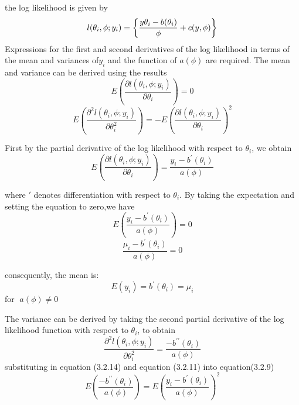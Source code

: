 the log likelihood is given by
\begin{equation}
	\centering 
	l(\theta_i,\phi;y_i) =\left\{ \frac{y\theta_i-b(\theta_i)}{\phi} + c(y,\phi)\right\}
\end{equation}
Expressions for the first and second derivatives of the log likelihood in terms of the mean and variances of$y_i$ and the function of $a(\phi)$ are required. The mean and variance can be derived using the results
\begin{equation}
	E\left(\frac{\partial l(\theta_i,\phi;y_i)}{\partial\theta_i}\right)=0
\end{equation}
\begin{equation}	
	E\left(\frac{\partial^2 l(\theta_i,\phi;y_i)}{\partial\theta_i^2}\right)= -E\left(\frac{\partial l(\theta_i,\phi;y_i)}{\partial\theta_i}\right)^2
\end{equation}

First by the partial derivative of the log likelihood with respect to $\theta_i$, we obtain 
\begin{equation}
	E\left(\frac{\partial l(\theta_i,\phi;y_i)}{\partial\theta_i}\right)=\frac{y_i-b^{\prime}(\theta_i)}{a(\phi)}
\end{equation}

where $\prime$ denotes differentiation with respect to $\theta_i$. By taking the expectation and setting the equation to zero,we have
\begin{equation}
	E\left(\frac{y_i-b^{\prime}(\theta_i)}{a(\phi)}\right)=0
\end{equation}
\begin{equation}
	\frac{\mu_i-b^{\prime}(\theta_i)}{a(\phi)}= 0
\end{equation}

consequently, the mean is:
\begin{equation}
	E(y_i) = b^{\prime}(\theta_i)= \mu_i 
\end{equation}
for$\;$ $a(\phi)\ne0$


The variance can be derived by taking the second partial derivative of the log likelihood function with respect to $\theta_i$, to obtain
\begin{equation}
	\frac{\partial^2 l(\theta_i,\phi;y_i)}{\partial\theta_i^2}=\frac{-b^{\prime\prime}(\theta_i)}{a(\phi)}
\end{equation}
substituting in equation (3.2.14) and equation (3.2.11) into equation(3.2.9)
\begin{equation}
	E\left(\frac{-b^{\prime\prime}(\theta_i)}{a(\phi)}\right)=E\left(\frac{y_i-b^{\prime}(\theta_i)}{a(\phi)}\right)^2
\end{equation}

